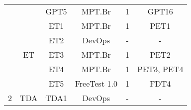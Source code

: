 \begin{table}[H]
{\begin{tabular}{|c|c|c|c|c|c|}
                                                                                      &                                           & GPT5                      & MPT.Br                           & 1                                                                               & GPT16                                                                                \\ \cline{2-6} 
                                                                                      & \multirow{5}{*}{ET}                       & ET1                       & MPT.Br                           & 1                                                                               & PET1                                                                                 \\ \cline{3-6} 
                                                                                      &                                           & ET2                       & DevOps                           & -                                                                               & -                                                                                    \\ \cline{3-6} 
                                                                                      &                                           & ET3                       & MPT.Br                           & 1                                                                               & PET2                                                                                 \\ \cline{3-6} 
                                                                                      &                                           & ET4                       & MPT.Br                           & 1                                                                               & PET3, PET4                                                                           \\ \cline{3-6} 
                                                                                      &                                           & ET5                       & FreeTest 1.0                     & 1                                                                               & FDT4                                                                                 \\ \hline
\multirow{10}{*}{2}                                                                   & \multicolumn{1}{l|}{\multirow{3}{*}{TDA}} & \multicolumn{1}{l|}{TDA1} & DevOps                           & -                                                                               & -                                                                                    \\ \cline{3-6} 

\end{tabular}}
\end{table}

